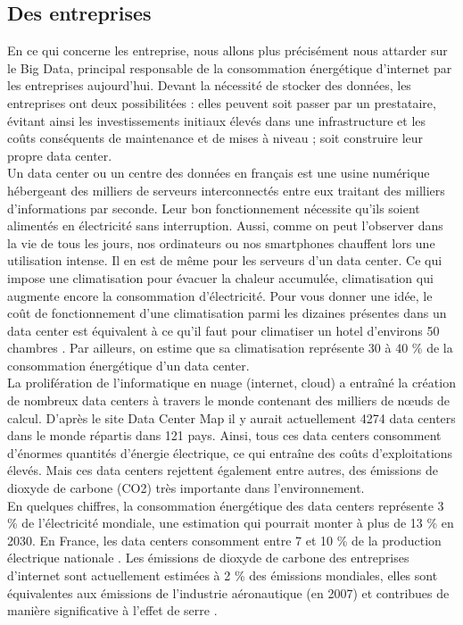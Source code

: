 \documentclass[a4paper,twocolumn,12pt]{article}
\begin{document}
\subsection{Des entreprises}
	
	En ce qui concerne les entreprise, nous allons plus précisément nous attarder sur le Big Data, principal responsable de la consommation énergétique d’internet par les entreprises aujourd’hui. Devant la nécessité de stocker des données, les entreprises ont deux possibilitées : elles peuvent soit passer par un prestataire, évitant ainsi les investissements initiaux élevés dans une infrastructure et les coûts conséquents de maintenance et de mises à niveau ; soit construire leur propre data center. \\

	Un data center ou un centre des données en français est une usine numérique hébergeant des milliers de serveurs interconnectés entre eux traitant des milliers d'informations par seconde. Leur bon fonctionnement nécessite qu’ils soient alimentés en électricité sans interruption. Aussi, comme on peut l’observer dans la vie de tous les jours, nos ordinateurs ou nos smartphones chauffent lors une utilisation intense. Il en est de même pour les serveurs d’un data center. Ce qui impose une climatisation pour évacuer la chaleur accumulée, climatisation qui augmente encore la consommation d'électricité. Pour vous donner une idée, le coût de fonctionnement d’une climatisation parmi les dizaines présentes dans un data center est équivalent à ce qu’il faut pour climatiser un hotel d’environs 50 chambres \cite{5}. Par ailleurs, on estime que sa climatisation représente 30 à 40 \% de la consommation énergétique d’un data center. \\

	La prolifération de l'informatique en nuage (internet, cloud) a entraîné la création de nombreux data centers à travers le monde contenant des milliers de nœuds de calcul. D’après le site Data Center Map \cite{6} il y aurait actuellement 4274 data centers dans le monde répartis dans 121 pays. Ainsi, tous ces data centers consomment d'énormes quantités d'énergie électrique, ce qui entraîne des coûts d'exploitations élevés. Mais ces data centers rejettent également entre autres, des émissions de dioxyde de carbone (CO2) très importante dans l'environnement. \\

	En quelques chiffres, la consommation énergétique des data centers représente 3 \% de l’électricité mondiale, une estimation qui pourrait monter à plus de 13 \% en 2030. En France, les data centers consomment entre 7 et 10 \% de la production électrique nationale \cite{7}. Les émissions de dioxyde de carbone des entreprises d'internet sont actuellement estimées à 2 \% des émissions mondiales, elles sont équivalentes aux émissions de l'industrie aéronautique (en 2007) \cite{8} et contribues de manière significative à l'effet de serre \cite{9}.
\end{document}
